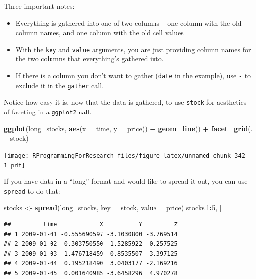 \documentclass[]{book}
\makeatletter
\newenvironment{Shaded}{\begin{snugshade}}{\end{snugshade}}
\newcommand{\KeywordTok}[1]{\textcolor[rgb]{0.13,0.29,0.53}{\textbf{#1}}}
\newcommand{\DataTypeTok}[1]{\textcolor[rgb]{0.13,0.29,0.53}{#1}}
\newcommand{\DecValTok}[1]{\textcolor[rgb]{0.00,0.00,0.81}{#1}}
\newcommand{\StringTok}[1]{\textcolor[rgb]{0.31,0.60,0.02}{#1}}
\newcommand{\OperatorTok}[1]{\textcolor[rgb]{0.81,0.36,0.00}{\textbf{#1}}}
\newcommand{\NormalTok}[1]{#1}
\providecommand{\tightlist}{%
  \setlength{\itemsep}{0pt}\setlength{\parskip}{0pt}}
\newenvironment{kframe}{%
\medskip{}
\setlength{\fboxsep}{.8em}
 \def\at@end@of@kframe{}%
 \ifinner\ifhmode%
  \def\at@end@of@kframe{\end{minipage}}%
  \begin{minipage}{\columnwidth}%
 \fi\fi%
 \def\FrameCommand##1{\hskip\@totalleftmargin \hskip-\fboxsep
 \colorbox{shadecolor}{##1}\hskip-\fboxsep
     \hskip-\linewidth \hskip-\@totalleftmargin \hskip\columnwidth}%
 \MakeFramed {\advance\hsize-\width
   \@totalleftmargin\z@ \linewidth\hsize
   \@setminipage}}%
 {\par\unskip\endMakeFramed%
 \at@end@of@kframe}
\renewenvironment{Shaded}{\begin{kframe}}{\end{kframe}}
\theoremstyle{definition}
\theoremstyle{definition}
\theoremstyle{definition}
\theoremstyle{remark}
\makeatother
\begin{document}
Three important notes:

\begin{itemize}
\tightlist
\item
  Everything is gathered into one of two columns -- one column with the
  old column names, and one column with the old cell values
\item
  With the \texttt{key} and \texttt{value} arguments, you are just
  providing column names for the two columns that everything's gathered
  into.
\item
  If there is a column you don't want to gather (\texttt{date} in the
  example), use \texttt{-} to exclude it in the \texttt{gather} call.
\end{itemize}

Notice how easy it is, now that the data is gathered, to use
\texttt{stock} for aesthetics of faceting in a \texttt{ggplot2} call:

\begin{Shaded}
\begin{Highlighting}[]
\KeywordTok{ggplot}\NormalTok{(long_stocks, }\KeywordTok{aes}\NormalTok{(}\DataTypeTok{x =}\NormalTok{ time, }\DataTypeTok{y =}\NormalTok{ price)) }\OperatorTok{+}\StringTok{ }
\StringTok{  }\KeywordTok{geom_line}\NormalTok{() }\OperatorTok{+}\StringTok{ }
\StringTok{  }\KeywordTok{facet_grid}\NormalTok{(. }\OperatorTok{~}\StringTok{ }\NormalTok{stock)}
\end{Highlighting}
\end{Shaded}

\texttt{[image: RProgrammingForResearch\_files/figure-latex/unnamed-chunk-342-1.pdf]}

If you have data in a ``long'' format and would like to spread it out,
you can use \texttt{spread} to do that:

\begin{Shaded}
\begin{Highlighting}[]
\NormalTok{stocks <-}\StringTok{ }\KeywordTok{spread}\NormalTok{(long_stocks, }\DataTypeTok{key =}\NormalTok{ stock, }\DataTypeTok{value =}\NormalTok{ price)}
\NormalTok{stocks[}\DecValTok{1}\OperatorTok{:}\DecValTok{5}\NormalTok{, ]}
\end{Highlighting}
\end{Shaded}

\begin{verbatim}
##         time            X          Y         Z
## 1 2009-01-01 -0.555690597 -3.1030800 -3.769514
## 2 2009-01-02 -0.303750550  1.5285922 -0.257525
## 3 2009-01-03 -1.476718459  0.8535507 -3.397125
## 4 2009-01-04  0.195218490  3.0403177 -2.169216
## 5 2009-01-05  0.001640985 -3.6458296  4.970278
\end{verbatim}
\end{document}
